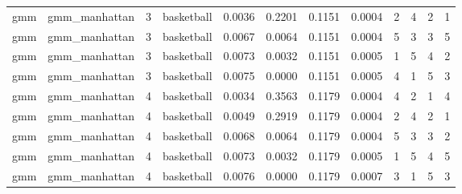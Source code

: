 \documentclass[
]{article}
\begin{document}
\begin{longtable}{| p{1.1cm} | p{2cm} | p{0.8cm} | p{1.3cm} | p{0.60cm} | p{0.7cm} | p{0.65cm} | p{0.65cm} | p{0.65cm} | p{0.65cm} | p{0.7cm} | p{0.65cm} |}
\scriptsize     gmm   & \scriptsize    gmm\_manhattan & \scriptsize    3    & \scriptsize basketball & \scriptsize    0.0036  &  \scriptsize 0.2201 & \scriptsize 0.1151 & \scriptsize    0.0004 & \scriptsize   2  & \scriptsize    4  & \scriptsize    2  & \scriptsize    1 \\
\scriptsize     gmm   & \scriptsize    gmm\_manhattan & \scriptsize    3    & \scriptsize basketball & \scriptsize    0.0067  &  \scriptsize 0.0064 & \scriptsize 0.1151 & \scriptsize    0.0004 & \scriptsize   5  & \scriptsize    3  & \scriptsize    3  & \scriptsize    5 \\
\scriptsize     gmm   & \scriptsize    gmm\_manhattan & \scriptsize    3    & \scriptsize basketball & \scriptsize    0.0073  &  \scriptsize 0.0032 & \scriptsize 0.1151 & \scriptsize    0.0005 & \scriptsize   1  & \scriptsize    5  & \scriptsize    4  & \scriptsize    2 \\
\scriptsize     gmm   & \scriptsize    gmm\_manhattan & \scriptsize    3    & \scriptsize basketball & \scriptsize    0.0075  &  \scriptsize 0.0000 & \scriptsize 0.1151 & \scriptsize    0.0005 & \scriptsize   4  & \scriptsize    1  & \scriptsize    5  & \scriptsize    3 \\
\cline{3-12}
\scriptsize     gmm   & \scriptsize    gmm\_manhattan & \scriptsize    4    & \scriptsize basketball & \scriptsize    0.0034  &  \scriptsize 0.3563 & \scriptsize 0.1179 & \scriptsize    0.0004 & \scriptsize   4  & \scriptsize    2  & \scriptsize    1  & \scriptsize    4 \\
\scriptsize     gmm   & \scriptsize    gmm\_manhattan & \scriptsize    4    & \scriptsize basketball & \scriptsize    0.0049  &  \scriptsize 0.2919 & \scriptsize 0.1179 & \scriptsize    0.0004 & \scriptsize   2  & \scriptsize    4  & \scriptsize    2  & \scriptsize    1 \\
\scriptsize     gmm   & \scriptsize    gmm\_manhattan & \scriptsize    4    & \scriptsize basketball & \scriptsize    0.0068  &  \scriptsize 0.0064 & \scriptsize 0.1179 & \scriptsize    0.0004 & \scriptsize   5  & \scriptsize    3  & \scriptsize    3  & \scriptsize    2 \\
\scriptsize     gmm   & \scriptsize    gmm\_manhattan & \scriptsize    4    & \scriptsize basketball & \scriptsize    0.0073  &  \scriptsize 0.0032 & \scriptsize 0.1179 & \scriptsize    0.0005 & \scriptsize   1  & \scriptsize    5  & \scriptsize    4  & \scriptsize    5 \\
\scriptsize     gmm   & \scriptsize    gmm\_manhattan & \scriptsize    4    & \scriptsize basketball & \scriptsize    0.0076  &  \scriptsize 0.0000 & \scriptsize 0.1179 & \scriptsize    0.0007 & \scriptsize   3  & \scriptsize    1  & \scriptsize    5  & \scriptsize    3 \\

\end{longtable}
\end{document}
